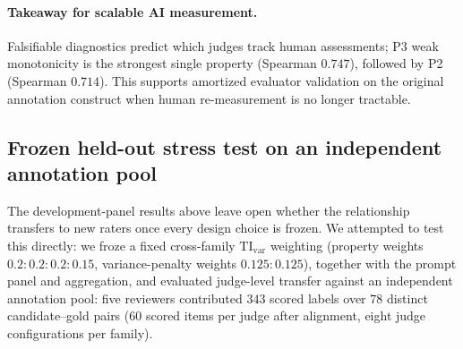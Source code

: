 \documentclass{article}
\begin{document}
\paragraph{Takeaway for scalable AI measurement.}
Falsifiable diagnostics predict which judges track human assessments; P3 weak monotonicity is the strongest single property (Spearman \(0.747\)), followed by P2 (Spearman \(0.714\)). This supports amortized evaluator validation on the original annotation construct when human re-measurement is no longer tractable.

\subsection{Frozen held-out stress test on an independent annotation pool}\label{sec:heldout-stress}
The development-panel results above leave open whether the relationship transfers to new raters once every design choice is frozen.
We attempted to test this directly: we froze a fixed cross-family \(\mathrm{TI}_{\mathrm{var}}\) weighting (property weights \(0.2{:}0.2{:}0.2{:}0.15\), variance-penalty weights \(0.125{:}0.125\)), together with the prompt panel and aggregation, and evaluated judge-level transfer against an independent annotation pool: five reviewers contributed \(343\) scored labels over \(78\) distinct candidate--gold pairs (\(60\) scored items per judge after alignment, eight judge configurations per family).
\end{document}
